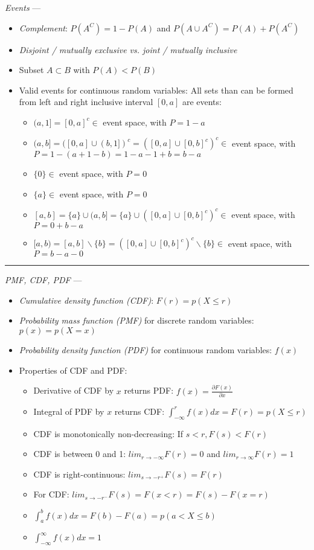 \emph{Events} --- 
\begin{itemize}
    \item \emph{Complement}: $P(A^C) = 1 - P(A)$ and $P(A \cup A^C) = P(A)+P(A^C)$
    \item \emph{Disjoint / mutually exclusive vs. joint / mutually inclusive}
    \item Subset $A \subset B$ with $P(A) < P(B)$
    \item Valid events for continuous random variables: All sets than can be formed from left and right inclusive interval $[0,a]$ are events:
    \begin{itemize}
        \item $(a,1] = [0,a]^c \in$ event space, with $P = 1 - a$
        \item $(a,b] = ([0,a] \cup (b,1])^c = ([0,a] \cup [0,b]^c)^c \in$ event space, with $P = 1 - (a + 1 - b) = 1 - a - 1 + b = b - a$
        \item $\{0\} \in$ event space, with $P = 0$
        \item $\{a\} \in$ event space, with $P = 0$
        \item $[a,b] = \{a\} \cup (a,b] = \{a\} \cup ([0,a] \cup [0,b]^c)^c \in$ event space, with $P = 0 + b - a$
        \item $[a,b) = [a,b] \backslash \{b\} = ([0,a] \cup [0,b]^c)^c \backslash \{b\} \in$ event space, with $P = b - a - 0$
    \end{itemize}
\end{itemize}

{\color{lightgray}\hrule height 0.001mm}

\emph{PMF, CDF, PDF} --- 
\begin{itemize}
    \item \emph{Cumulative density function (CDF)}: $F(r) = p(X \leq r)$
    \item \emph{Probability mass function (PMF)} for discrete random variables: $p(x) = p(X = x)$
    \item \emph{Probability density function (PDF)} for continuous random variables: $f(x)$
    \item Properties of CDF and PDF:
    \begin{itemize}
        \item Derivative of CDF by $x$ returns PDF: $f(x) = \frac{\partial F(x)}{\partial x}$
        \item Integral of PDF by $x$ returns CDF: $\int_{-\infty}^r f(x)dx = F(r) = p(X \leq r)$
        \item CDF is monotonically non-decreasing: If $s<r, F(s) < F(r)$
        \item CDF is between 0 and 1: $lim_{r\rightarrow-\infty} F(r) = 0$ and $lim_{r\rightarrow\infty} F(r) = 1$
        \item CDF is right-continuous: $lim_{s\rightarrow-r^+} F(s) = F(r)$
        \item For CDF: $lim_{s\rightarrow-r^-} F(s) = F(x < r) = F(s) - F(x = r)$
        \item $\int_a^b f(x)dx = F(b)-F(a) = p(a < X \leq b)$
        \item $\int_{-\infty}^\infty f(x)dx = 1$
    \end{itemize}
\end{itemize}


